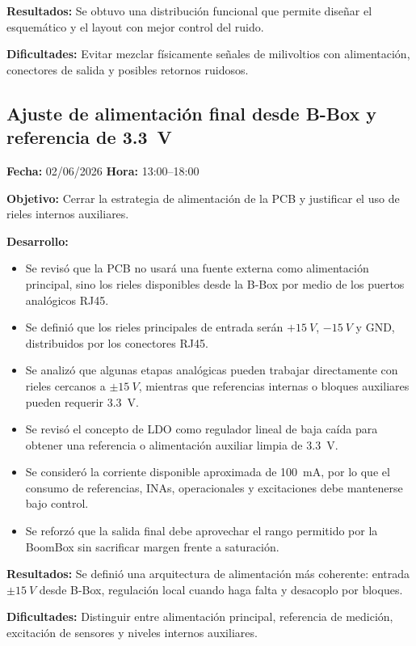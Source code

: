 \documentclass[12pt]{article}
\begin{document}
\textbf{Resultados:}
Se obtuvo una distribución funcional que permite diseñar el esquemático y el layout con mejor control del ruido.

\textbf{Dificultades:}
Evitar mezclar físicamente señales de milivoltios con alimentación, conectores de salida y posibles retornos ruidosos.

\subsection{Ajuste de alimentación final desde B-Box y referencia de \SI{3.3}{V}}
\textbf{Fecha:} 02/06/2026 \quad \textbf{Hora:} 13:00--18:00

\textbf{Objetivo:}
Cerrar la estrategia de alimentación de la PCB y justificar el uso de rieles internos auxiliares.

\textbf{Desarrollo:}
\begin{itemize}
\item Se revisó que la PCB no usará una fuente externa como alimentación principal, sino los rieles disponibles desde la B-Box por medio de los puertos analógicos RJ45.
\item Se definió que los rieles principales de entrada serán \( +\SI{15}{V} \), \( -\SI{15}{V} \) y GND, distribuidos por los conectores RJ45.
\item Se analizó que algunas etapas analógicas pueden trabajar directamente con rieles cercanos a \(\pm\SI{15}{V}\), mientras que referencias internas o bloques auxiliares pueden requerir \SI{3.3}{V}.
\item Se revisó el concepto de LDO como regulador lineal de baja caída para obtener una referencia o alimentación auxiliar limpia de \SI{3.3}{V}.
\item Se consideró la corriente disponible aproximada de \SI{100}{mA}, por lo que el consumo de referencias, INAs, operacionales y excitaciones debe mantenerse bajo control.
\item Se reforzó que la salida final debe aprovechar el rango permitido por la BoomBox sin sacrificar margen frente a saturación.
\end{itemize}

\textbf{Resultados:}
Se definió una arquitectura de alimentación más coherente: entrada \(\pm\SI{15}{V}\) desde B-Box, regulación local cuando haga falta y desacoplo por bloques.

\textbf{Dificultades:}
Distinguir entre alimentación principal, referencia de medición, excitación de sensores y niveles internos auxiliares.
\end{document}
